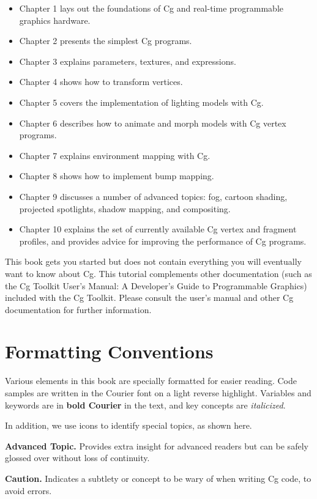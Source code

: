 \documentclass{book}
\begin{document}
\FloatBarrier
\begin{itemize}
\item Chapter 1 lays out the foundations of Cg and real-time programmable graphics hardware.
\item Chapter 2 presents the simplest Cg programs.
\item Chapter 3 explains parameters, textures, and expressions.
\item Chapter 4 shows how to transform vertices.
\item Chapter 5 covers the implementation of lighting models with Cg.
\item Chapter 6 describes how to animate and morph models with Cg vertex programs.
\item Chapter 7 explains environment mapping with Cg.
\item Chapter 8 shows how to implement bump mapping.
\item Chapter 9 discusses a number of advanced topics: fog, cartoon shading, projected spotlights, shadow mapping, and compositing.
\item Chapter 10 explains the set of currently available Cg vertex and fragment profiles, and provides advice for improving the performance of Cg programs.
\end{itemize}
\FloatBarrier

This book gets you started but does not contain everything you will eventually want to know about Cg. This tutorial complements other documentation (such as the Cg Toolkit User's Manual: A Developer's Guide to Programmable Graphics) included with the Cg Toolkit. Please consult the user's manual and other Cg documentation for further information.

\section*{Formatting Conventions}

Various elements in this book are specially formatted for easier reading. Code samples are written in the Courier font on a light reverse highlight. Variables and keywords are in \textbf{bold Courier} in the text, and key concepts are \textit{italicized}.

In addition, we use icons to identify special topics, as shown here.

\textbf{Advanced Topic.} Provides extra insight for advanced readers but can be safely glossed over without loss of continuity.

\textbf{Caution.} Indicates a subtlety or concept to be wary of when writing Cg code, to avoid errors.
\end{document}
